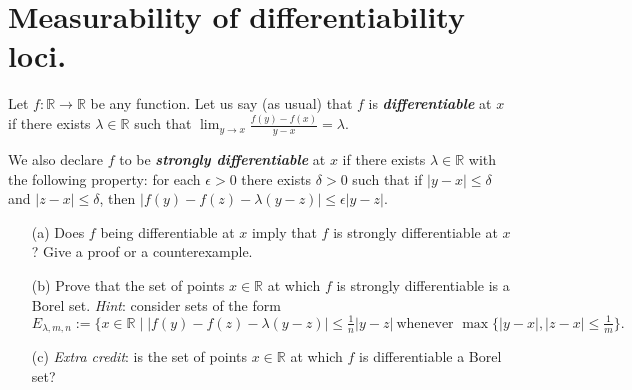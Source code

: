 \documentclass[lang=cn,11pt]{elegantbook}
\begin{document}
\section{Measurability of differentiability loci.}
Let $f\colon\mathbb{R}\to\mathbb{R}$ be any function. Let us say (as usual) that $f$ is \textbf{\emph{differentiable}} at $x$ if there exists $\lambda\in \mathbb{R}$ such that $\lim_{y\to x}\frac{f(y)-f(x)}{y-x}=\lambda$. 
  
We also declare $f$ to be\textbf{ \emph{strongly differentiable} }at $x$ if there exists $\lambda\in \mathbb{R}$ with the following property: for each $\epsilon>0$ there exists $\delta>0$ such that if $|y-x|\le\delta$ and $|z-x|\le\delta$, then $|f(y)-f(z)-\lambda(y-z)|\le\epsilon |y-z|$.


  \begin{itemize}
  \item[(a)]Does $f$ being differentiable at $x$ imply that $f$ is strongly differentiable at $x$? Give a proof or a counterexample.
  \item[(b)]Prove that the set of points $x\in \mathbb{R}$ at which $f$ is strongly differentiable is a Borel set. \textit{Hint}: consider sets of the form    \[
      E_{\lambda,m,n}:=\{x\in \mathbb{R} \mid |f(y)-f(z)-\lambda(y-z)|\le\tfrac1n|y-z|\
      \text{whenever $\max\{|y-x|,|z-x|\le\tfrac1m$}\}.
      \]
  \item[(c)]\textit{Extra credit}: is the set of points $x\in \mathbb{R}$ at which $f$ is differentiable a Borel set?
  \end{itemize}
  
\end{document}
